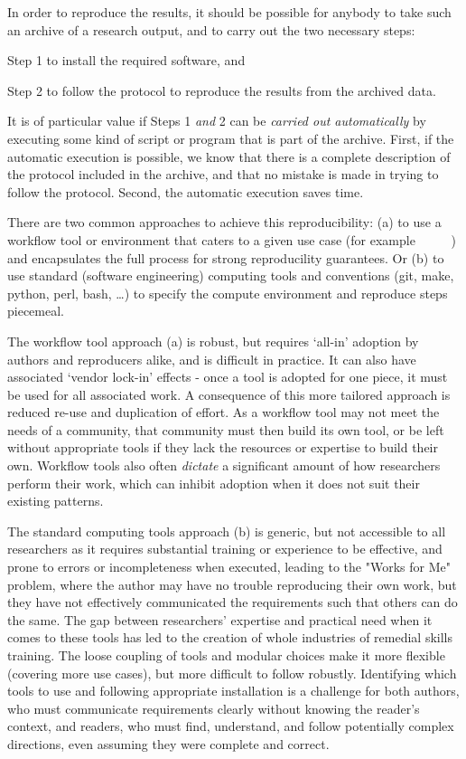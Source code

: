 In order to reproduce the results, it should be possible for anybody to take such an archive of a research
output, and to carry out the two necessary steps:
\begin{compactitem}
\item Step 1 to install the required software, and
\item Step 2 to follow the protocol to reproduce the results from the archived data.
\end{compactitem}

It is of particular value if Steps 1 \emph{and} 2 can be \emph{carried out
  automatically} by executing some kind of script or program that is part of the
archive. First, if the automatic execution is possible, we know that there is a
complete description of the protocol included in the archive, and that no
mistake is made in trying to follow the protocol. Second, the automatic
execution saves time.

There are two common approaches to achieve this reproducibility: (a) to use a
workflow tool or environment that caters to a given use case (for example
~\cite{reana2019} ~\cite{Afgan2018} ~\cite{Mlder2021} )
and encapsulates the full process for strong reproducility guarantees.
Or (b) to use standard (software engineering) computing tools and conventions
(git, make, python, perl, bash, \ldots)
to specify the compute environment and reproduce steps piecemeal.

The workflow tool approach (a) is robust, but requires `all-in' adoption by authors and reproducers alike,
and is difficult in practice. It can also have associated `vendor lock-in' effects
- once a tool is adopted for one piece, it must be used for all associated work.
A consequence of this more tailored approach is reduced re-use and duplication of effort.
As a workflow tool may not meet the needs of a community,
that community must then build its own tool, or be left without appropriate tools
if they lack the resources or expertise to build their own.
Workflow tools also often \emph{dictate} a significant amount of how researchers perform their work,
which can inhibit adoption when it does not suit their existing patterns.

The standard computing tools approach (b) is generic, but not accessible to all researchers
as it requires substantial training or experience to be effective,
and prone to errors or incompleteness when executed,
leading to the "Works for Me" problem,
where the author may have no trouble reproducing their own work,
but they have not effectively communicated the requirements such that others can do the same.
The gap
between researchers' expertise and practical need when it comes to these tools has led to the creation 
of whole industries of remedial skills training.
The loose coupling of tools and modular choices make it more flexible (covering more use cases),
but more difficult to follow robustly.
Identifying which tools to use and following appropriate installation is a challenge
for both authors, who must communicate requirements clearly without knowing the reader's context,
and readers, who must find, understand, and follow potentially complex directions, even assuming they were 
complete and correct.

